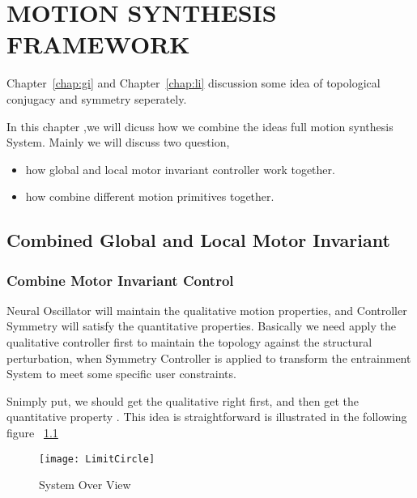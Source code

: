 \chapter {MOTION SYNTHESIS FRAMEWORK}
\label{chap:msf}
\ifpdf
    \graphicspath{{CombineFramework/CombineFrameworkFigs/PNG/}{CombineFramework/CombineFrameworkFigs/PDF/}{CombineFramework/CombineFrameworkFigs/}}
\else
    \graphicspath{{CombineFramework/CombineFrameworkFigs/EPS/}{CombineFramework/CombineFrameworkFigs/}}
\fi

Chapter~\ref{chap:gi}  and Chapter~\ref{chap:li} discussion some idea of topological conjugacy and symmetry seperately.

In this chapter ,we will dicuss how we combine the ideas full motion synthesis System.
Mainly we will discuss two question,
\begin{itemize}
\item how global and local motor invariant controller work together.
\item how combine different motion primitives together.
\end{itemize}

\section{Combined Global and Local Motor Invariant}

\subsection{ Combine Motor Invariant Control}

Neural Oscillator will maintain the qualitative motion properties, and Controller Symmetry will satisfy the quantitative properties.
Basically we need apply the qualitative controller first to maintain the topology against the structural perturbation, 
when Symmetry Controller is applied to transform the entrainment System to meet some specific user constraints.


Snimply put, we should get the qualitative right first, and then get the quantitative property .
This idea is straightforward is illustrated in the following figure ~\ref{fig:sysoverview}

\begin{figure}[!htbp]
  \begin{center}
      \texttt{[image: LimitCircle]}
    \caption{System Over View }
    \label{fig:sysoverview}
  \end{center}
\end{figure}

